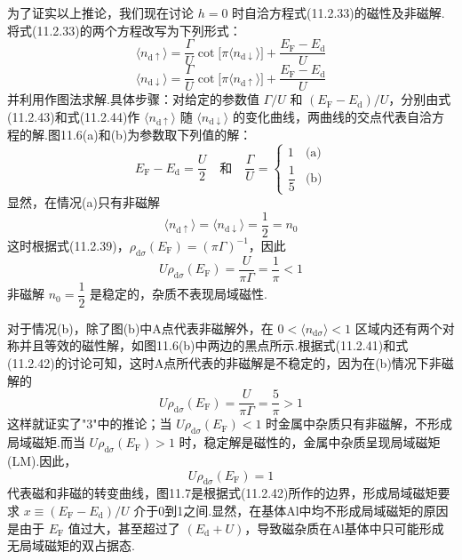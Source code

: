 为了证实以上推论，我们现在讨论 $h=0$ 时自洽方程式(11.2.33)的磁性及非磁解.将式(11.2.33)的两个方程改写为下列形式：
\begin{equation}
  \langle n_{\mathrm{d}\uparrow}\rangle
  =\frac{\Gamma}{U}\cot\bigl[\pi\langle n_{\mathrm{d}\downarrow}\rangle\bigr]
  +\frac{E_{\mathrm{F}}-E_{\mathrm{d}}}{U}
\end{equation}
\begin{equation}
  \langle n_{\mathrm{d}\downarrow}\rangle
  =\frac{\Gamma}{U}\cot\bigl[\pi\langle n_{\mathrm{d}\uparrow}\rangle\bigr]
  +\frac{E_{\mathrm{F}}-E_{\mathrm{d}}}{U}
\end{equation}
并利用作图法求解.具体步骤：对给定的参数值 $\Gamma/U$ 和 $(E_{\mathrm{F}}-E_{\mathrm{d}})/U$，分别由式(11.2.43)和式(11.2.44)作 $\langle n_{\mathrm{d}\uparrow}\rangle$ 随 $\langle n_{\mathrm{d}\downarrow}\rangle$ 的变化曲线，两曲线的交点代表自洽方程的解.图11.6(a)和(b)为参数取下列值的解：
\begin{equation}
  E_{\mathrm{F}}-E_{\mathrm{d}}=\frac{U}{2}
  \quad\text{和}\quad
  \frac{\Gamma}{U}=
  \begin{cases}1&\text{(a)}\\[0.3em] \dfrac{1}{5}&\text{(b)}\end{cases}
\end{equation}
显然，在情况(a)只有非磁解
\begin{equation*}
  \langle n_{\mathrm{d}\uparrow}\rangle
  =\langle n_{\mathrm{d}\downarrow}\rangle
  =\frac{1}{2}=n_{0}
\end{equation*}
这时根据式(11.2.39)，$\rho_{\mathrm{d}\sigma}(E_{\mathrm{F}})=(\pi\Gamma)^{-1}$，因此
\begin{equation}
  U\rho_{\mathrm{d}\sigma}(E_{\mathrm{F}})
  =\frac{U}{\pi\Gamma}=\frac{1}{\pi}<1
\end{equation}
非磁解 $n_{0}=\dfrac{1}{2}$ 是稳定的，杂质不表现局域磁性.

对于情况(b)，除了图(b)中A点代表非磁解外，在 $0<\langle n_{\mathrm{d}\sigma}\rangle<1$ 区域内还有两个对称并且等效的磁性解，如图11.6(b)中两边的黑点所示.根据式(11.2.41)和式(11.2.42)的讨论可知，这时A点所代表的非磁解是不稳定的，因为在(b)情况下非磁解的
\begin{equation}
  U\rho_{\mathrm{d}\sigma}(E_{\mathrm{F}})
  =\frac{U}{\pi\Gamma}=\frac{5}{\pi}>1
\end{equation}
这样就证实了"3"中的推论；当 $U\rho_{\mathrm{d}\sigma}(E_{\mathrm{F}})<1$ 时金属中杂质只有非磁解，不形成局域磁矩.而当 $U\rho_{\mathrm{d}\sigma}(E_{\mathrm{F}})>1$ 时，稳定解是磁性的，金属中杂质呈现局域磁矩(LM).因此，
\begin{equation*}
  U\rho_{\mathrm{d}\sigma}(E_{\mathrm{F}})=1
\end{equation*}
代表磁和非磁的转变曲线，图11.7是根据式(11.2.42)所作的边界，形成局域磁矩要求 $x\equiv(E_{\mathrm{F}}-E_{\mathrm{d}})/U$ 介于0到1之间.显然，在基体Al中均不形成局域磁矩的原因是由于 $E_{\mathrm{F}}$ 值过大，甚至超过了 $(E_{\mathrm{d}}+U)$，导致磁杂质在Al基体中只可能形成无局域磁矩的双占据态.

